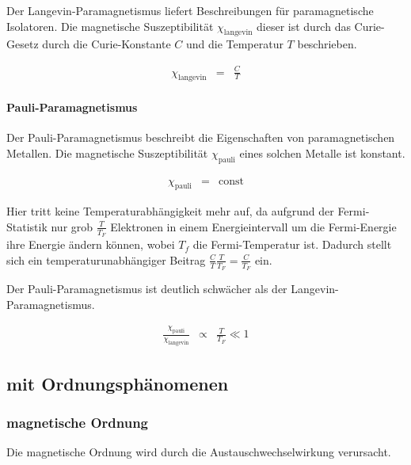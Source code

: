 \documentclass[12pt,a4paper]{scrartcl}
\numberwithin{equation}{section} %
\begin{document}
Der Langevin-Paramagnetismus liefert Beschreibungen für paramagnetische
Isolatoren. Die magnetische Suszeptibilität $\chi_\mathrm{langevin}$
dieser ist durch das Curie-Gesetz durch die Curie-Konstante $C$ und
die Temperatur $T$ beschrieben.

\begin{eqnarray}
    \chi_\mathrm{langevin} &=& \frac{C}{T}
\end{eqnarray}

\hypertarget{pauli-paramagnetismus}{%
\paragraph{Pauli-Paramagnetismus}\label{pauli-paramagnetismus}}

Der Pauli-Paramagnetismus beschreibt die Eigenschaften von
paramagnetischen Metallen. Die magnetische Suszeptibilität
$\chi_\mathrm{pauli}$ eines solchen Metalle ist konstant.

\begin{eqnarray}
    \chi_\mathrm{pauli} &=& \mathrm{const}
\end{eqnarray}

Hier tritt keine Temperaturabhängigkeit mehr auf, da aufgrund der
Fermi-Statistik nur grob $\frac{T}{T_F}$ Elektronen in einem
Energieintervall um die Fermi-Energie ihre Energie ändern können, wobei
$T_{f}$ die Fermi-Temperatur ist. Dadurch stellt sich ein
temperaturunabhängiger Beitrag
$\frac{C}{T} \frac{T}{T_F} = \frac{C}{T_F}$ ein.

Der Pauli-Paramagnetismus ist deutlich schwächer als der
Langevin-Paramagnetismus.

\begin{eqnarray}
    \frac{\chi_\mathrm{pauli}}{\chi_\mathrm{langevin}}
        &\propto& \frac{T}{T_F} \ll 1
\end{eqnarray}

\hypertarget{mit-ordnungsphuxe4nomenen}{%
\subsection{mit Ordnungsphänomenen}\label{mit-ordnungsphuxe4nomenen}}

\hypertarget{magnetische-ordnung}{%
\subsubsection{magnetische Ordnung}\label{magnetische-ordnung}}

Die magnetische Ordnung wird durch die Austauschwechselwirkung
verursacht.
\end{document}
